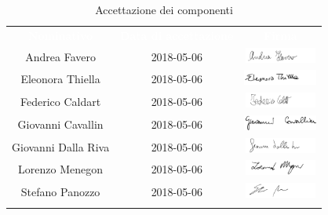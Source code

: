 \begin{longtable}{ c  c  c }
	\rowcolor{bluSOS}
	\textcolor{white}{\textbf{Nominativo}} & \textcolor{white}{\textbf{Data di accettazione}} & \textcolor{white}{\textbf{Firma}}\\
	Andrea Favero & 2018-05-06 & \includegraphics[height=0.5cm]{img/Firme/AndreaFavero.png} \\
	
	Eleonora Thiella & 2018-05-06 & \includegraphics[height=0.5cm]{img/Firme/EleonoraThiella.png} \\
	
	Federico Caldart & 2018-05-06 & \includegraphics[height=0.5cm]{img/Firme/FedericoCaldart.png} \\
	
	Giovanni Cavallin & 2018-05-06 & \includegraphics[height=0.5cm]{img/Firme/GiovanniCavallin.png} \\
	
	Giovanni Dalla Riva & 2018-05-06 & \includegraphics[height=0.5cm]{img/Firme/GiovanniDallaRiva.png} \\
	
	Lorenzo Menegon & 2018-05-06 & \includegraphics[height=0.5cm]{img/Firme/LorenzoMenegon.png} \\
	
	Stefano Panozzo & 2018-05-06 & \includegraphics[height=0.5cm]{img/Firme/StefanoPanozzo.png} \\
	\rowcolor{white}\caption{Accettazione dei componenti}\\
\end{longtable}



